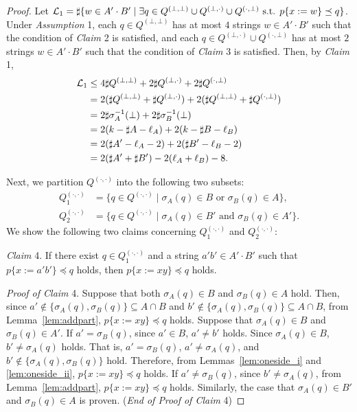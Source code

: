 \begin{proof}
\smallskip

\noindent
Let ${\cal L}_{1} = \sharp\{w \in A'\cdot B' \mid \exists q \in Q^{(\bot,\bot)} \cup Q^{(\bot,\cdot)} \cup Q^{(\cdot,\bot)} \mbox{ s.t. } p\{x:=w\} \preceq q\}$.
Under \textit{Assumption} 1, each $q\in Q^{(\bot,\bot)}$ has at most $4$ strings $w \in A'\cdot B'$ such that the condition of \textit{Claim} 2 is satisfied, and each $q \in Q^{(\bot,\cdot)} \cup Q^{(\cdot,\bot)}$ has at most $2$ strings $w \in A'\cdot B'$ such that the condition of \textit{Claim} 3 is satisfied.
Then, by \textit{Claim} 1,
\begin{align*}
  {\cal L}_{1} &\leq 4\sharp Q^{(\bot,\bot)} + 2\sharp Q^{(\bot,\cdot)} + 2\sharp Q^{(\cdot,\bot)}\\
  & = 2(\sharp Q^{(\bot,\bot)} + \sharp Q^{(\bot,\cdot)}) + 2(\sharp Q^{(\bot,\bot)} + \sharp Q^{(\cdot,\bot)})\\
  & = 2\sharp \sigma_{A}^{-1}(\bot) + 2\sharp \sigma_{B}^{-1}(\bot)\\
  & = 2(k - \sharp A - \ell_{A}) + 2(k - \sharp B - \ell_{B})\\
  & = 2(\sharp A' - \ell_{A} - 2) + 2(\sharp B' - \ell_{B} - 2)\\
  & = 2(\sharp A' + \sharp B') - 2(\ell_{A} + \ell_{B}) - 8.
\end{align*}

Next, we partition $Q^{(\cdot,\cdot)}$ into the following two subsets:
\begin{align*}
  Q_{1}^{(\cdot,\cdot)} & = \{q \in Q^{(\cdot,\cdot)} \mid \sigma_{A}(q) \in B \mbox{ or } \sigma_{B}(q) \in A\},\\
  Q_{2}^{(\cdot,\cdot)} & = \{q \in Q^{(\cdot,\cdot)} \mid \sigma_{A}(q) \in B' \mbox{ and } \sigma_{B}(q) \in A'\}.
\end{align*}
We show the {\color{red}following} two claims {\color{red}concerning} $Q_{1}^{(\cdot,\cdot)}$ and $Q_{2}^{(\cdot,\cdot)}$:

\smallskip

\noindent
\textit{Claim} 4.
If there exist $q \in Q_{1}^{(\cdot,\cdot)}$ and a string $a'b' \in A'\cdot B'$ such that $p\{x:=a'b'\} \preceq q$ holds, then $p\{x:=xy\} \preceq q$ holds.

\smallskip

\noindent
\textit{Proof of Claim} 4.
Suppose that both $\sigma_{A}(q) \in B$ and $\sigma_{B}(q) \in A$ hold. Then, since $a' \not\in \{\sigma_{A}(q), \sigma_{B}(q)\} \subseteq A\cap B$ and $b' \not\in \{\sigma_{A}(q), \sigma_{B}(q)\} \subseteq A\cap B$, from Lemma~\ref{lem:addpart}, $p\{x:=xy\} \preceq q$ holds.
Suppose that $\sigma_{A}(q)\in B$ and $\sigma_{B}(q)\in A'$.
If $a' = \sigma_{B}(q)$, since $a' \in B$, $a' \not= b'$ holds.
Since $\sigma_{A}(q)\in B$, $b' \not= \sigma_{A}(q)$ holds.
That is, $a' = \sigma_{B}(q)$, $a' \not= \sigma_{A}(q)$, and $b' \not\in \{\sigma_{A}(q), \sigma_{B}(q)\}$ hold.
Therefore, from Lemmas~\ref{lem:oneside_i} and \ref{lem:oneside_ii}, $p\{x:=xy\} \preceq q$ holds.
If $a' \not= \sigma_{B}(q)$, since $b' \not= \sigma_{A}(q)$, from Lemma~\ref{lem:addpart}, $p\{x:=xy\} \preceq q$ holds.
Similarly, the case that $\sigma_{A}(q)\in B'$ and $\sigma_{B}(q)\in A$ is proven. (\textit{End of Proof of Claim} 4)


\end{proof}
